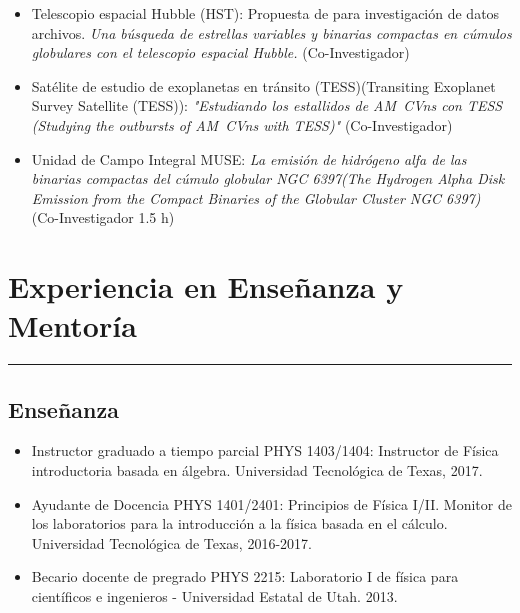 \documentclass[letterpaper,10pt]{article}
\begin{document}
  \begin{itemize}[label=$\blacktriangleright$]
      \item Telescopio espacial Hubble (HST):  Propuesta de para investigaci\'on de datos archivos. \emph{Una b\'usqueda de estrellas variables y binarias compactas en c\'umulos globulares con el telescopio espacial Hubble.} (Co-Investigador)
  \end{itemize}
  
  

\begin{itemize}[label=$\blacktriangleright$]
      \item   Sat\'elite de estudio de exoplanetas en tr\'ansito (TESS)(Transiting Exoplanet Survey Satellite (TESS)): \emph{"Estudiando los estallidos de AM~CVns con TESS (Studying the outbursts of AM~CVns with TESS)"} (Co-Investigador)
  \end{itemize}


  \begin{itemize}[label=$\blacktriangleright$]
        \item  Unidad de Campo Integral MUSE: \emph{La emisi\'on de hidr\'ogeno alfa de las binarias compactas del c\'umulo globular NGC 6397(The Hydrogen Alpha Disk Emission from the Compact Binaries of the Globular Cluster NGC 6397)} (Co-Investigador 1.5 h)
  \end{itemize}


\section*{Experiencia en Ense\~{n}anza y Mentor\'ia}

\hrule
\vspace{.3 cm}
\subsection*{Ense\~{n}anza}

\begin{itemize}[label=$\blacktriangleright$]
\item   Instructor graduado a tiempo parcial PHYS 1403/1404: Instructor de F\'isica introductoria basada en \'algebra. Universidad Tecnol\'ogica de Texas, 2017.
 
 \item   Ayudante de Docencia PHYS 1401/2401: Principios de F\'isica I/II. Monitor de los laboratorios  para la introducci\'on a la f\'isica basada en el c\'alculo. Universidad Tecnol\'ogica de Texas, 2016-2017.

 \item Becario docente de pregrado PHYS 2215: Laboratorio I de f\'isica para cient\'ificos e ingenieros - Universidad Estatal de Utah. 2013.
 
 
 
  \end{itemize}
  
\end{document}
